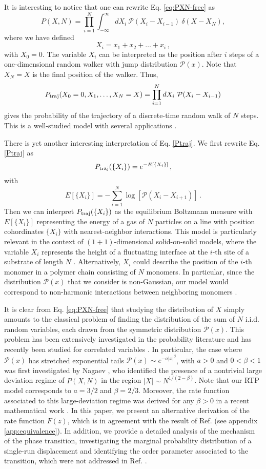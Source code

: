 \documentclass[aps,pre,twocolumn,superscriptaddress,showpacs]{revtex4-1}
\newcommand{\be}{\begin{equation}}
\newcommand{\ee}{\end{equation}}
\newcommand{\mP}{\mathcal{P}}
\begin{document}
It is interesting to notice that one can rewrite Eq. \eqref{eq:PXN-free} as
\be
P(X,N) =  \prod_{i=1}^N \int_{-\infty}^{\infty}
dX_i~\mP(X_i-X_{i-1})~\delta\left(X-X_N\right),
\label{eq:PXN-freeb}
\ee
where we have defined
\be 
X_i=x_1+x_2+\ldots+x_i\,,
\ee
with $X_0=0$. The variable $X_i$ can be interpreted as the position after $i$ steps of a one-dimensional random walker with jump distribution $\mP(x)$. Note that $X_N=X$ is the final position of the walker. Thus,
\be 
P_{\rm traj}(X_0=0,X_1,\ldots,X_N=X)=\prod_{i=1}^N dX_i~\mP(X_i-X_{i-1})\label{Ptraj}
\ee
gives the probability of the trajectory of a discrete-time random walk of $N$ steps. This is a well-studied model with several applications \cite{M10}.


There is yet another interesting interpretation of Eq. \eqref{Ptraj}. We first rewrite Eq. \eqref{Ptraj} as
\be 
P_{\rm traj}(\{X_i\})=e^{-E[\{X_i\}]}\,,\label{Ptraj2}
\ee
with
\begin{equation}
E[\{X_i\}]=-\sum_{i=1}^{N}\log\left[\mP\left(X_i-X_{i+1}\right)\right]\,.
\end{equation}
Then we can interpret $P_{\rm traj}(\{X_i\})$ as the equilibrium Boltzmann measure with $E[\{X_i\}]$ representing the energy of a gas of $N$ particles on a line with position cohordinates $\{X_i\}$ with nearest-neighbor interactions. This model is particularly relevant in the context of $(1+1)$-dimensional solid-on-solid models, where the variable $X_i$ represents the height of a fluctuating interface at the $i$-th site of a substrate of length $N$ \cite{SM06}. Alternatively, $X_i$ could describe the position of the $i$-th monomer in a polymer chain consisting of $N$ monomers. In particular, since the distribution $\mP(x)$ that we consider is non-Gaussian, our model would correspond to non-harmonic interactions between neighboring monomers \cite{PVV17}.


It is clear from Eq. \eqref{eq:PXN-free} that studying the
distribution of $X$ simply amounts to the classical problem of finding
the distribution of the sum of $N$ i.i.d. random variables, each drawn
from the symmetric distribution $\mP(x)$. This problem has been
extensively investigated in the probability literature
\cite{Feller_book} and has recently been studied for correlated variables \cite{HB21}. In particular, the case where $\mP(x)$ has
stretched exponential tails $\mP(x)\sim e^{-a |x|^{\beta}}$, with
$a>0$ and $0<\beta<1$ was first investigated by Nagaev
\cite{nagaev1,nagaev2}, who identified the presence of a nontrivial
large deviation regime of $P(X,N)$ in the region $|X|\sim
N^{1/(2-\beta)}$. Note that our RTP model corresponds to $a=3/2$ and
$\beta=2/3$. Moreover, the rate function associated to this
large-deviation regime was derived for any $\beta>0$ in a recent
mathematical work \cite{BKL20}. In this paper, we present an
alternative derivation of the rate function $F(z)$, which is in
agreement with the result of Ref. \cite{BKL20} (see appendix \ref{app:equivalence}). In addition, we provide a detailed analysis of the mechanism of the phase transition,
investigating the marginal probability distribution of a single-run
displacement and identifying the order parameter associated to the
transition, which were not addressed in Ref. \cite{BKL20}.
\end{document}
